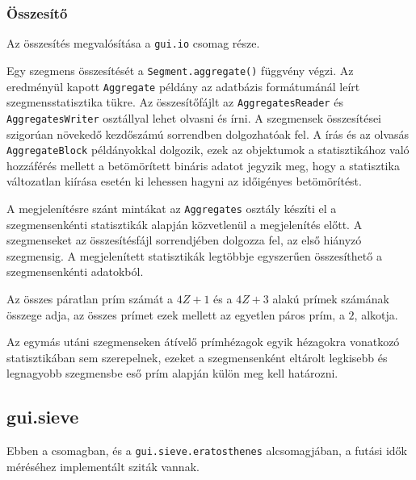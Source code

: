 \subsubsection{Összesítő}

Az összesítés megvalósítása a \texttt{gui.io} csomag része.

Egy szegmens összesítését a \texttt{Segment.aggregate()} függvény végzi.
Az eredményül kapott \texttt{Aggregate} példány az adatbázis formátumánál leírt szegmensstatisztika tükre.
Az összesítőfájlt az \texttt{AggregatesReader} és \texttt{AggregatesWriter} osztállyal lehet olvasni és írni.
A szegmensek összesítései szigorúan növekedő kezdőszámú sorrendben dolgozhatóak fel.
A írás és az olvasás \texttt{AggregateBlock} példányokkal dolgozik, ezek az objektumok a statisztikához való hozzáférés mellett a betömörített bináris adatot jegyzik meg, hogy a statisztika változatlan kiírása esetén ki lehessen hagyni az időigényes betömörítést.

A megjelenítésre szánt mintákat az \texttt{Aggregates} osztály készíti el a szegmensenkénti statisztikák alapján közvetlenül a megjelenítés előtt.
A szegmenseket az összesítésfájl sorrendjében dolgozza fel, az első hiányzó szegmensig.
A megjelenített statisztikák legtöbbje egyszerűen összesíthető a szegmensenkénti adatokból.

Az összes páratlan prím számát a $4Z+1$ és a $4Z+3$ alakú prímek számának összege adja, az összes prímet ezek mellett az egyetlen páros prím, a $2$, alkotja.

Az egymás utáni szegmenseken átívelő prímhézagok egyik hézagokra vonatkozó statisztikában sem szerepelnek, ezeket a szegmensenként eltárolt legkisebb és legnagyobb szegmensbe eső prím alapján külön meg kell határozni.

\subsection{gui.sieve}

Ebben a csomagban, és a \texttt{gui.sieve.eratosthenes} alcsomagjában, a futási idők méréséhez implementált sziták vannak.

